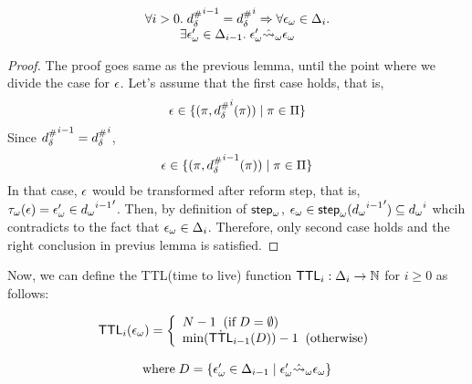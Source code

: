 \begin{corollary}\label{corollary:only-from-diffset}
  \[
    \begin{array}{c}
      \forall i > 0. \; {{d}^{\#}_\delta}^{i-1} = {{d}^{\#}_\delta}^i \Rightarrow
      \forall {\epsilon}_\omega \in \Delta_i. \\
      \exists {\epsilon}_\omega' \in \Delta_{i-1} . \; {\epsilon}_\omega' \hat{\leadsto}_\omega {\epsilon}_\omega
    \end{array}
  \]
\end{corollary}
\begin{proof}
  The proof goes same as the previous lemma, until the point where we divide
  the case for $\epsilon$. Let's assume that the first case holds, that is,
  \[
    \epsilon \in \{ (\pi, {{d}^{\#}_\delta}^i(\pi)) \mid \pi \in \Pi \}
  \]
  Since ${{d}^{\#}_\delta}^{i-1} = {{d}^{\#}_\delta}^i$,
  \[
    \epsilon \in \{ (\pi, {{d}^{\#}_\delta}^{i-1}(\pi)) \mid \pi \in \Pi \}
  \]
  In that case, $\epsilon$ would be transformed after reform step, that is,
  ${\tau}_\omega(\epsilon) = {\epsilon}_\omega' \in {{{d}_\omega}^{i-1}}'$.
  Then, by definition of ${\textsf{step}}_\omega$,
  ${\epsilon}_\omega \in {\textsf{step}}_\omega({{{d}_\omega}^{i-1}}') \subseteq {{d}_\omega}^i$
  whcih contradicts to the fact that ${\epsilon}_\omega \in \Delta_i$.
  Therefore, only second case holds and the right conclusion in previus lemma is satisfied.
\end{proof}

Now, we can define the TTL(time to live) function
$\textsf{TTL}_i: \Delta_i \rightarrow \mathbb{N}$ for $i \geq 0$ as follows:
\begin{definition}
  \[
    \begin{array}{c} 
      \textsf{TTL}_i({\epsilon}_\omega) = \left \{
      \begin{array}{l}
        N - 1 \;\; ( \text{if} \; D = \emptyset)\\
        \text{min}(\dot{\textsf{TTL}}_{i-1}(D)) - 1
        \;\; ( \text{otherwise})
      \end{array}
      \right. \\
      \\
      \text{where} \; D = 
      \{{\epsilon}_\omega' \in \Delta_{i-1} \mid {\epsilon}_\omega' \hat{\leadsto}_\omega {\epsilon}_\omega\}
    \end{array}
  \]
\end{definition}

